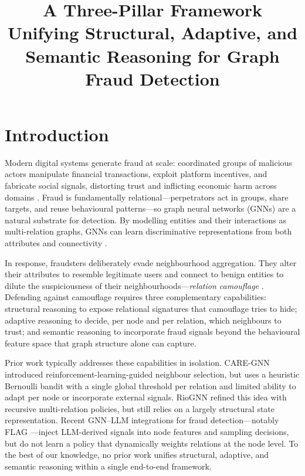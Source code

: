 \documentclass{conf}
\title{A Three-Pillar Framework Unifying Structural, Adaptive, and Semantic Reasoning for Graph Fraud Detection}
\begin{document}
\maketitle

\section{Introduction}

Modern digital systems generate fraud at scale: coordinated groups of malicious actors manipulate financial transactions, exploit platform incentives, and fabricate social signals, distorting trust and inflicting economic harm across domains \cite{ngai2011application}. Fraud is fundamentally relational---perpetrators act in groups, share targets, and reuse behavioural patterns---so graph neural networks (GNNs) are a natural substrate for detection. By modelling entities and their interactions as multi-relation graphs, GNNs can learn discriminative representations from both attributes and connectivity \cite{wu2021graph}.

In response, fraudsters deliberately evade neighbourhood aggregation. They alter their attributes to resemble legitimate users and connect to benign entities to dilute the suspiciousness of their neighbourhoods---\emph{relation camouflage} \cite{dou2020enhancing}. Defending against camouflage requires three complementary capabilities: structural reasoning to expose relational signatures that camouflage tries to hide; adaptive reasoning to decide, per node and per relation, which neighbours to trust; and semantic reasoning to incorporate fraud signals beyond the behavioural feature space that graph structure alone can capture.

Prior work typically addresses these capabilities in isolation. CARE-GNN \cite{dou2020enhancing} introduced reinforcement-learning-guided neighbour selection, but uses a heuristic Bernoulli bandit with a single global threshold per relation and limited ability to adapt per node or incorporate external signals. RioGNN \cite{peng2022reinforced} refined this idea with recursive multi-relation policies, but still relies on a largely structural state representation. Recent GNN--LLM integrations for fraud detection---notably FLAG \cite{yang2025flag}---inject LLM-derived signals into node features and sampling decisions, but do not learn a policy that dynamically weights relations at the node level. To the best of our knowledge, no prior work unifies structural, adaptive, and semantic reasoning within a single end-to-end framework.
\end{document}
